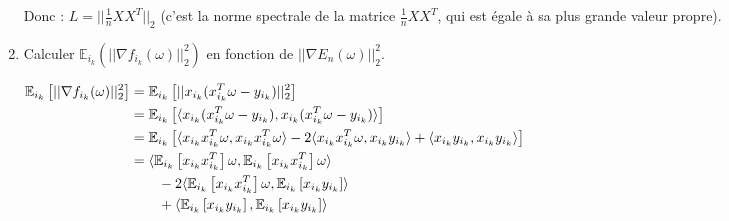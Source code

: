 \documentclass[12pt,a4paper]{article}
\begin{document}
\begin{enumerate}
    Donc : $L = ||\frac{1}{n} XX^T||_2$ (c'est la norme spectrale de la matrice $\frac{1}{n} XX^T$, qui est égale à sa plus grande valeur propre).\\

    \color{black}
    \item Calculer $\mathbb{E}_{i_k} (||\nabla f_{i_k} (\omega)||_2^2)$ en fonction de $||\nabla E_n(\omega)||_2^2$.
    
    \color{blue}
    \begin{align*}
        \mathbb{E}_{i_k} \left[||\nabla f_{i_k} (\omega)||_2^2\right] &= \mathbb{E}_{i_k} \left[||x_{i_k}(x_{i_k}^T \omega - y_{i_k})||_2^2\right] \hspace{14.5cm}\\
        &= \mathbb{E}_{i_k} \left[ \langle x_{i_k}(x_{i_k}^T \omega - y_{i_k}), x_{i_k}(x_{i_k}^T \omega - y_{i_k}) \rangle \right] \\
        &= \mathbb{E}_{i_k} \left[ \langle x_{i_k}x_{i_k}^T \omega, x_{i_k}x_{i_k}^T \omega \rangle - 2 \langle x_{i_k}x_{i_k}^T \omega, x_{i_k}y_{i_k} \rangle + \langle x_{i_k}y_{i_k}, x_{i_k}y_{i_k} \rangle \right] \\
        &= \langle \mathbb{E}_{i_k} \left[ x_{i_k}x_{i_k}^T \right] \omega, \mathbb{E}_{i_k} \left[ x_{i_k}x_{i_k}^T \right] \omega \rangle \\
        &\qquad - 2 \langle \mathbb{E}_{i_k} \left[ x_{i_k}x_{i_k}^T \right] \omega, \mathbb{E}_{i_k} \left[ x_{i_k}y_{i_k} \right] \rangle \\
        &\qquad + \langle \mathbb{E}_{i_k} \left[ x_{i_k}y_{i_k} \right], \mathbb{E}_{i_k} \left[ x_{i_k}y_{i_k} \right] \rangle \\
    \end{align*}

    \color{black}
\end{enumerate}
\end{document}
